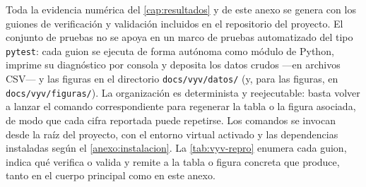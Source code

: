 Toda la evidencia numérica del \autoref{cap:resultados} y de este anexo se genera con los guiones de verificación y validación incluidos en el repositorio del proyecto. El conjunto de pruebas no se apoya en un marco de pruebas automatizado del tipo \texttt{pytest}: cada guion se ejecuta de forma autónoma como módulo de Python, imprime su diagnóstico por consola y deposita los datos crudos ---en archivos CSV--- y las figuras en el directorio \texttt{docs/vyv/datos/} (y, para las figuras, en \texttt{docs/vyv/figuras/}). La organización es determinista y reejecutable: basta volver a lanzar el comando correspondiente para regenerar la tabla o la figura asociada, de modo que cada cifra reportada puede repetirse. Los comandos se invocan desde la raíz del proyecto, con el entorno virtual activado y las dependencias instaladas según el \autoref{anexo:instalacion}. La \autoref{tab:vyv-repro} enumera cada guion, indica qué verifica o valida y remite a la tabla o figura concreta que produce, tanto en el cuerpo principal como en este anexo.

